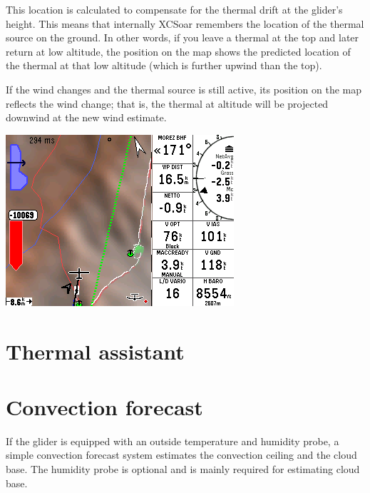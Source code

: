 \documentclass[a4paper,12pt]{refrep}
\begin{document}
  This location is calculated to compensate for the thermal drift at
  the glider's height.  This means that internally XCSoar remembers
  the location of the thermal source on the ground.  In other words,
  if you leave a thermal at the top and later return at low altitude,
  the position on the map shows the predicted location of the thermal
  at that low altitude (which is further upwind than the top).  

  If the wind changes and the thermal source is still active, its
  position on the map reflects the wind change; that is, the thermal
  at altitude will be projected downwind at the new wind estimate.

\begin{center}
\includegraphics[angle=0,width=\linewidth,keepaspectratio='true']{figures/shot-tlocator-cruise.png}
\end{center}

\section{Thermal assistant}

\section{Convection forecast}\label{sec:convection-forecast}

If the glider is equipped with an outside temperature and humidity
probe, a simple convection forecast system estimates the convection
ceiling and the cloud base.  The humidity probe is optional and is
mainly required for estimating cloud base.
\end{document}
